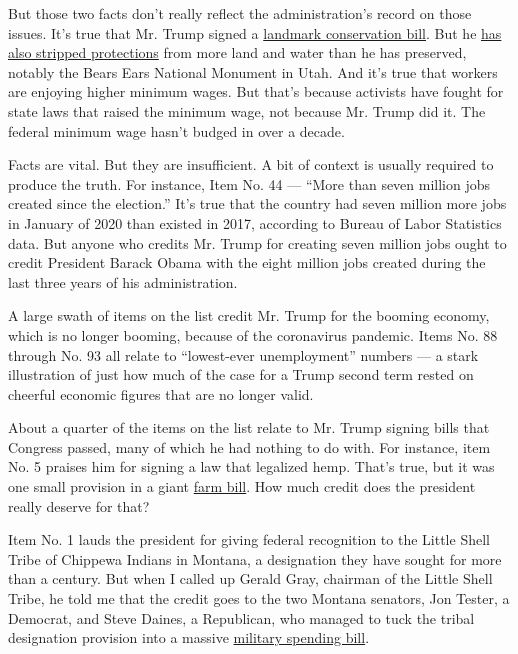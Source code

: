 But those two facts don't really reflect the administration's record on
those issues. It's true that Mr. Trump signed a
\href{https://www.pbs.org/newshour/show/what-a-broad-bipartisan-public-lands-bill-means-for-the-american-wilderness}{landmark
conservation bill}. But he
\href{https://www.arcgis.com/apps/Cascade/index.html?appid=3c85766bc4c44579a2a7bb133b70e774}{has
also stripped protections} from more land and water than he has
preserved, notably the Bears Ears National Monument in Utah. And it's
true that workers are enjoying higher minimum wages. But that's because
activists have fought for state laws that raised the minimum wage, not
because Mr. Trump did it. The federal minimum wage hasn't budged in over
a decade.

Facts are vital. But they are insufficient. A bit of context is usually
required to produce the truth. For instance, Item No. 44 --- ``More than
seven million jobs created since the election.'' It's true that the
country had seven million more jobs in January of 2020 than existed in
2017, according to Bureau of Labor Statistics data. But anyone who
credits Mr. Trump for creating seven million jobs ought to credit
President Barack Obama with the eight million jobs created during the
last three years of his administration.

A large swath of items on the list credit Mr. Trump for the booming
economy, which is no longer booming, because of the coronavirus
pandemic. Items No. 88 through No. 93 all relate to ``lowest-ever
unemployment'' numbers --- a stark illustration of just how much of the
case for a Trump second term rested on cheerful economic figures that
are no longer valid.

About a quarter of the items on the list relate to Mr. Trump signing
bills that Congress passed, many of which he had nothing to do with. For
instance, item No. 5 praises him for signing a law that legalized hemp.
That's true, but it was one small provision in a giant
\href{https://www.brookings.edu/blog/fixgov/2018/12/14/the-farm-bill-hemp-and-cbd-explainer/}{farm
bill}. How much credit does the president really deserve for that?

Item No. 1 lauds the president for giving federal recognition to the
Little Shell Tribe of Chippewa Indians in Montana, a designation they
have sought for more than a century. But when I called up Gerald Gray,
chairman of the Little Shell Tribe, he told me that the credit goes to
the two Montana senators, Jon Tester, a Democrat, and Steve Daines, a
Republican, who managed to tuck the tribal designation provision into a
massive
\href{https://www.nytimes3xbfgragh.onion/2019/12/11/us/politics/house-ndaa-space-force-leave.html}{military
spending bill}.

